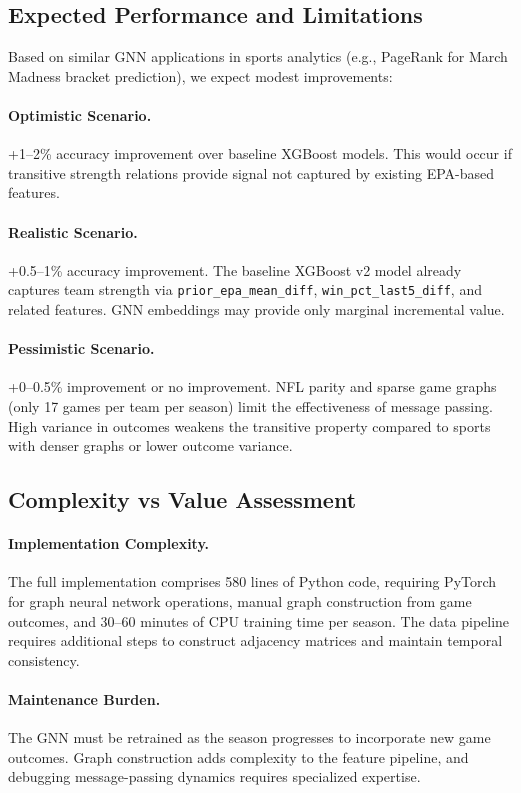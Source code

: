 \subsection{Expected Performance and Limitations}
Based on similar GNN applications in sports analytics (e.g., PageRank for March Madness bracket prediction), we expect modest improvements:

\paragraph{Optimistic Scenario.}
+1--2\% accuracy improvement over baseline XGBoost models. This would occur if transitive strength relations provide signal not captured by existing EPA-based features.

\paragraph{Realistic Scenario.}
+0.5--1\% accuracy improvement. The baseline XGBoost v2 model already captures team strength via \texttt{prior\_epa\_mean\_diff}, \texttt{win\_pct\_last5\_diff}, and related features. GNN embeddings may provide only marginal incremental value.

\paragraph{Pessimistic Scenario.}
+0--0.5\% improvement or no improvement. NFL parity and sparse game graphs (only 17 games per team per season) limit the effectiveness of message passing. High variance in outcomes weakens the transitive property compared to sports with denser graphs or lower outcome variance.

\subsection{Complexity vs Value Assessment}

\paragraph{Implementation Complexity.}
The full implementation comprises 580 lines of Python code, requiring PyTorch for graph neural network operations, manual graph construction from game outcomes, and 30--60 minutes of CPU training time per season. The data pipeline requires additional steps to construct adjacency matrices and maintain temporal consistency.

\paragraph{Maintenance Burden.}
The GNN must be retrained as the season progresses to incorporate new game outcomes. Graph construction adds complexity to the feature pipeline, and debugging message-passing dynamics requires specialized expertise.

